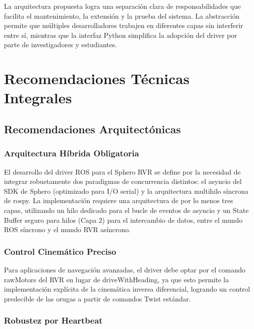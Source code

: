 \documentclass[11pt]{article}
\numberwithin{figure}{section}
\numberwithin{table}{section}
\begin{document}
La arquitectura propuesta logra una separación clara de responsabilidades que facilita el mantenimiento, la extensión y la prueba del sistema. La abstracción permite que múltiples desarrolladores trabajen en diferentes capas sin interferir entre sí, mientras que la interfaz Python simplifica la adopción del driver por parte de investigadores y estudiantes.


\newpage


\section{Recomendaciones Técnicas Integrales}
\label{sec:recomendaciones_tecnicas}


\subsection{Recomendaciones Arquitectónicas}


\subsubsection{Arquitectura Híbrida Obligatoria}

El desarrollo del driver ROS para el Sphero RVR se define por la necesidad de integrar robustamente dos paradigmas de concurrencia distintos: el asyncio del SDK de Sphero (optimizado para I/O serial) y la arquitectura multihilo síncrona de rospy. La implementación requiere una arquitectura de por lo menos tres capas, utilizando un hilo dedicado para el bucle de eventos de asyncio y un State Buffer seguro para hilos (Capa 2) para el intercambio de datos, entre el mundo ROS síncrono y el mundo RVR asíncrono.


\subsubsection{Control Cinemático Preciso}

Para aplicaciones de navegación avanzadas, el driver debe optar por el comando rawMotors del RVR en lugar de driveWithHeading, ya que esto permite la implementación explícita de la cinemática inversa diferencial, logrando un control predecible de las orugas a partir de comandos Twist estándar.


\subsubsection{Robustez por Heartbeat}
\end{document}
